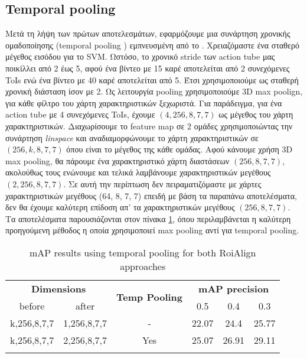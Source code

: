 \subsection{\en Temporal pooling \gr}

Μετά τη λήψη των πρώτων αποτελεσμάτων, εφαρμόζουμε μια συνάρτηση χρονικής ομαδοποίησης (\en temporal pooling \gr) εμπνευσμένη από το \en \cite{DBLP:journals/corr/HouCS17}\gr. Χρειαζόμαστε ένα
σταθερό μέγεθος εισόδου για το SVM. Ωστόσο, το χρονικό \en stride \gr των \en action tube \gr μας ποικίλλει από 2 έως 5, αφού ένα βίντεο με 15
καρέ αποτελείται από 2 συνεχόμενες \en ToIs \gr ενώ ένα βίντεο με 40 καρέ αποτελείται από 5.
Έτσι χρησιμοποιούμε ως σταθερή χρονική διάσταση ίσον με 2. Ως λειτουργία \en pooling \gr χρησιμοποιούμε \en 3D max poolign\gr,  για κάθε φίλτρο του χάρτη χαρακτηριστικών ξεχωριστά.  Για παράδειγμα, για ένα \en action tube \gr με 4 συνεχόμενες \en ToIs\gr, έχουμε $(4,256, 8, 7, 7)$ ως μέγεθος του χάρτη χαρακτηριστικών. Διαχωρίσουμε το \en feature map \gr  σε 2 ομάδες χρησιμοποιώντας την συνάρτηση \en\textit{linspace} \gr 
και  αναδιαμορφώνουμε το χάρτη χαρακτηριστικών σε $(256, k, 8, 7, 7)$ όπου  είναι το μέγεθος της κάθε ομάδας. Αφού κάνουμε
χρήση \en 3D max pooling\gr, θα πάρουμε ένα χαρακτηριστικό χάρτη διαστάσεων $(256, 8, 7, 7)$, ακολούθως τους ενώνουμε και τελικά
λαμβάνουμε χαρακτηριστικών μεγέθους $(2, 256, 8, 7, 7)$. Σε αυτή την περίπτωση δεν πειραματιζόμαστε με χάρτες χαρακτηριστικών μεγέθους
(64, 8, 7, 7)  επειδή με βάση τα παραπάνω αποτελέσματα, δεν θα έχουμε καλύτερη επίδοση απ' τα χαρακτηριστικών μεγέθους $(256, 8, 7, 7)$.
Tα αποτελέσματα  παρουσιάζονται στον πίνακα \ref{table:gr_svm_temp_pooling}, όπου περιλαμβάνεται η καλύτερη προηγούμενη μέθοδος η οποία
χρησιμοποιεί \en max pooling \gr αντί για \en temporal pooling\gr.

\begin{center}
\en
\begin{longtable}{||c | c|  c||c c c||}

  \hline
 \multicolumn{2}{||c|}{\textbf{Dimensions}} & \multirow{2}{*}{\textbf{Temp Pooling}}  &\multicolumn{3}{|c||}{\textbf{mAP precision}}\\

  before & after & {}   & 0.5 &  0.4 & 0.3\\
  \hline   \hline
  \multirow{1}{*}{k,256,8,7,7} & \multirow{1}{*}{1,256,8,7,7} & -  & 22.07 & 24.4 &  25.77 \\
  \hline
  \multirow{1}{*}{k,256,8,7,7} & \multirow{1}{*}{2,256,8,7,7} & Yes & 25.07 & 26.91 & 29.11 \\
  \hline

  \caption{mAP results using temporal pooling for both RoiAlign approaches}
  \label{table:gr_svm_temp_pooling}
\end{longtable} 
\end{center}

